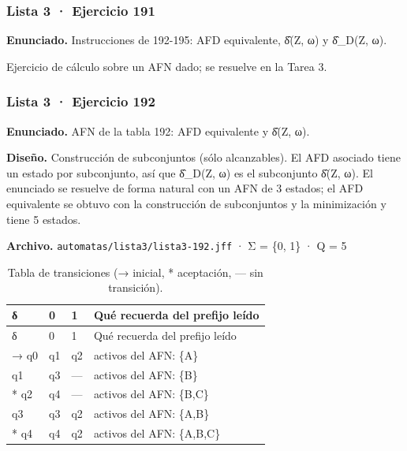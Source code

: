
\hypertarget{lista-3-ejercicio-191}{%
\subsubsection{Lista 3 · Ejercicio 191}\label{lista-3-ejercicio-191}}

\textbf{Enunciado.} Instrucciones de 192-195: AFD equivalente, δ̂(Z, ω) y δ̂\_D(Z, ω).

Ejercicio de cálculo sobre un AFN dado; se resuelve en la Tarea 3.

\hypertarget{lista-3-ejercicio-192}{%
\subsubsection{Lista 3 · Ejercicio 192}\label{lista-3-ejercicio-192}}

\textbf{Enunciado.} AFN de la tabla 192: AFD equivalente y δ̂(Z, ω).

\textbf{Diseño.} Construcción de subconjuntos (sólo alcanzables). El AFD asociado tiene un estado por subconjunto, así que δ̂\_D(Z, ω) es el subconjunto δ̂(Z, ω). El enunciado se resuelve de forma natural con un AFN de 3 estados; el AFD equivalente se obtuvo con la construcción de subconjuntos y la minimización y tiene 5 estados.

\textbf{Archivo.} \texttt{automatas/lista3/lista3-192.jff} · Σ = \{0, 1\} · \textbar Q\textbar{} = 5

\begin{longtable}[]{@{}llll@{}}
\caption{Tabla de transiciones (→ inicial, * aceptación, --- sin transición).}\tabularnewline
\toprule\noalign{}
δ & 0 & 1 & Qué recuerda del prefijo leído \\
\midrule\noalign{}
\endfirsthead
\toprule\noalign{}
δ & 0 & 1 & Qué recuerda del prefijo leído \\
\midrule\noalign{}
\endhead
\bottomrule\noalign{}
\endlastfoot
→ q0 & q1 & q2 & activos del AFN: \{A\} \\
q1 & q3 & --- & activos del AFN: \{B\} \\
* q2 & q4 & --- & activos del AFN: \{B,C\} \\
q3 & q3 & q2 & activos del AFN: \{A,B\} \\
* q4 & q4 & q2 & activos del AFN: \{A,B,C\} \\
\end{longtable}

